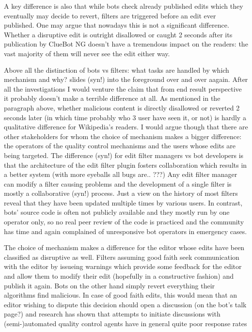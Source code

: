 
A key difference is also that while bots check already published edits which they eventually may decide to revert, filters are triggered before an edit ever published.
One may argue that nowadays this is not a significant difference.
Whether a disruptive edit is outright disallowed or caught 2 seconds after its publication by ClueBot NG doesn't have a tremendous impact on the readers:
the vast majority of them will never see the edit either way.

Above all the distinction of bots vs filters: what tasks are handled by which mechanism and why? slides (syn!) into the foreground over and over aagain.
After all the investigations I would venture the claim that from end result perspective it probably doesn't make a terrible difference at all.
As mentioned in the paragraph above, whether malicious content is directly disallowed or reverted 2 seconds later (in which time probably who 3 user have seen it, or not) is hardly a qualitative difference for Wikipedia's readers.
I would argue though that there are other stakeholders for whom the choice of mechanism makes a bigger difference:
the operators of the quality control mechanisms and the users whose edits are being targeted.
The difference (syn!) for edit filter managers vs bot developers is that the architecture of the edit filter plugin fosters collaboration which results in a better system (with more eyeballs all bugs are.. ???)
Any edit filter manager can modify a filter causing problems and the development of a single filter is mostly a collaborative (syn!) process.
Just a view on the history of most filters reveal that they have been updated multiple times by various users.
In contrast, bots' source code is often not publicly available and they mostly run by one operator only, so no real peer review of the code is practiced and the community has time and again complained of unresponsive bot operators in emergency cases.

The choice of mechanism makes a difference for the editor whose edits have been classified as disruptive as well.
Filters assuming good faith seek communication with the editor by issueing warnings which provide some feedback for the editor and allow them to modify their edit (hopefully in a constructive fashion) and publish it again.
Bots on the other hand simply revert everything their algorithms find malicious.
In case of good faith edits, this would mean that an editor wishing to dispute this decision should open a discussion (on the bot's talk page?) and research has shown that attempts to initiate discussions with (semi-)automated quality control agents have in general quite poor response rates %

